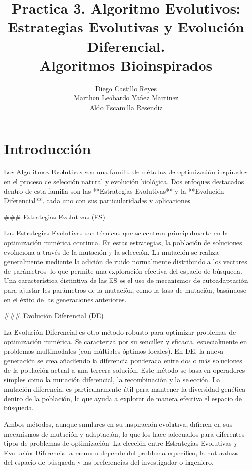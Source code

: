\documentclass{report}
\title{\Huge{\textbf{Practica 3. Algoritmo Evolutivos: Estrategias Evolutivas y Evolución Diferencial.}}\\
\Large{\textbf{Algoritmos Bioinspirados}}}
\author{Diego Castillo Reyes\\Marthon Leobardo Yañez Martinez\\Aldo Escamilla Resendiz}
\begin{document}
    \maketitle
    \tableofcontents
    \newpage
    \section{Introducción}
    Los Algoritmos Evolutivos son una familia de métodos de optimización inspirados en el proceso de selección natural y evolución biológica. Dos enfoques destacados dentro de esta familia son las **Estrategias Evolutivas** y la **Evolución Diferencial**, cada uno con sus particularidades y aplicaciones.

### Estrategias Evolutivas (ES)

Las Estrategias Evolutivas son técnicas que se centran principalmente en la optimización numérica continua. En estas estrategias, la población de soluciones evoluciona a través de la mutación y la selección. La mutación se realiza generalmente mediante la adición de ruido normalmente distribuido a los vectores de parámetros, lo que permite una exploración efectiva del espacio de búsqueda. Una característica distintiva de las ES es el uso de mecanismos de autoadaptación para ajustar los parámetros de la mutación, como la tasa de mutación, basándose en el éxito de las generaciones anteriores.

### Evolución Diferencial (DE)

La Evolución Diferencial es otro método robusto para optimizar problemas de optimización numérica. Se caracteriza por su sencillez y eficacia, especialmente en problemas multimodales (con múltiples óptimos locales). En DE, la nueva generación se crea añadiendo la diferencia ponderada entre dos o más soluciones de la población actual a una tercera solución. Este método se basa en operadores simples como la mutación diferencial, la recombinación y la selección. La mutación diferencial es particularmente útil para mantener la diversidad genética dentro de la población, lo que ayuda a explorar de manera efectiva el espacio de búsqueda.

Ambos métodos, aunque similares en su inspiración evolutiva, difieren en sus mecanismos de mutación y adaptación, lo que los hace adecuados para diferentes tipos de problemas de optimización. La elección entre Estrategias Evolutivas y Evolución Diferencial a menudo depende del problema específico, la naturaleza del espacio de búsqueda y las preferencias del investigador o ingeniero.
\end{document}
